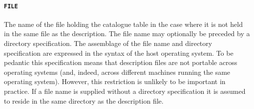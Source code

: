 \documentclass[twoside,11pt]{starlink}
\begin{document}
%
%
%
%
%

\paragraph{\texttt{FILE}} The name of the file holding the catalogue table
in the case where it is not held in the same file as the description.
The file name may optionally be preceded by a directory specification.
The assemblage of the file name and directory specification are
expressed in the syntax of the host operating system.  To be pedantic
this specification means that description files are not portable
across operating systems (and, indeed, across different machines
running the same operating system).  However, this restriction is
unlikely to be important in practice.  If a file name is supplied
without a directory specification it is assumed to reside in the same
directory as the description file.
\end{document}
